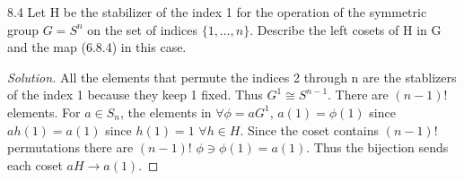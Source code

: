 \documentclass{article}
\newenvironment{solution}
{\renewcommand\qedsymbol{$\blacksquare$}\begin{proof}[Solution]}
{\end{proof}}
\begin{document}
\begin{PROB}{8.4}\label{Problem 8.4.}
    Let H be the stabilizer of the index 1 for the operation of the symmetric group $G = S^n$ on the set of indices $\{1, \ldots, n\}$. Describe the left cosets of H in G and the map (6.8.4) in this case.
\end{PROB}
\begin{solution}
    All the elements that permute the indices 2 through n are the stablizers of the index 1 because they keep 1 fixed. Thus $G^1 \cong S^{n-1}$. There are $(n-1)!$ elements. For $a \in S_n$, the elements in $\forall \phi = aG^1$, $a(1) = \phi(1)$ since $ah(1) = a(1)$ since $h(1) = 1$ $\forall h \in H$. Since the coset contains $(n-1)!$ permutations there are $(n-1)!$ $\phi \ni \phi(1) = a(1)$. Thus the bijection sends each coset $aH \to a(1)$.
\end{solution}

\bigskip
\end{document}

